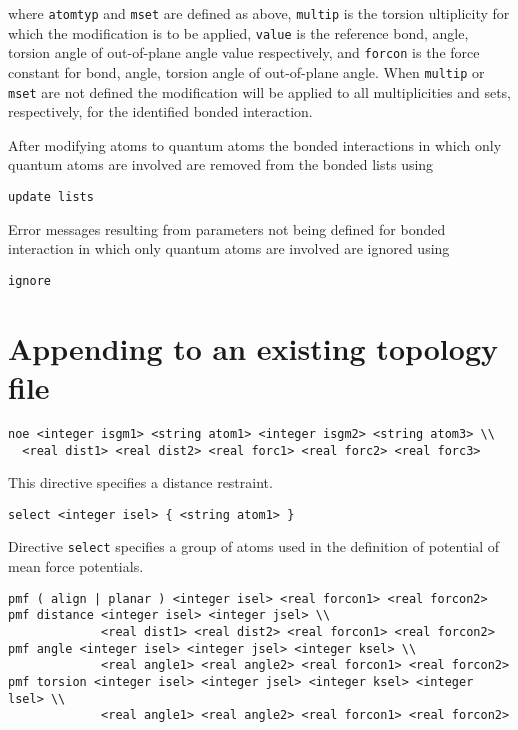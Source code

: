 where \verb+atomtyp+ and \verb+mset+ are defined as above, \verb+multip+
is the torsion ultiplicity for which the modification is to be applied,
\verb+value+ is the reference bond, angle, torsion angle of out-of-plane
angle value respectively, and \verb+forcon+ is the force constant for
bond, angle, torsion angle of out-of-plane angle. When \verb+multip+
or \verb+mset+ are not defined the modification will be applied to
all multiplicities and sets, respectively, for the identified bonded
interaction.

After modifying atoms to quantum atoms the bonded interactions in which
only quantum atoms are involved are removed from the bonded lists using

\begin{verbatim}
update lists
\end{verbatim}

Error messages resulting from parameters not being defined for bonded
interaction in which only quantum atoms are involved are ignored using

\begin{verbatim}
ignore
\end{verbatim}

\section{Appending to an existing topology file}

\begin{verbatim}
noe <integer isgm1> <string atom1> <integer isgm2> <string atom3> \\
  <real dist1> <real dist2> <real forc1> <real forc2> <real forc3>
\end{verbatim}

This directive specifies a distance restraint.

\begin{verbatim}
select <integer isel> { <string atom1> }
\end{verbatim}

Directive \verb+select+ specifies a group of atoms used in the
definition of potential of mean force potentials.

\begin{verbatim}
pmf ( align | planar ) <integer isel> <real forcon1> <real forcon2>
pmf distance <integer isel> <integer jsel> \\
             <real dist1> <real dist2> <real forcon1> <real forcon2>
pmf angle <integer isel> <integer jsel> <integer ksel> \\
             <real angle1> <real angle2> <real forcon1> <real forcon2>
pmf torsion <integer isel> <integer jsel> <integer ksel> <integer lsel> \\
             <real angle1> <real angle2> <real forcon1> <real forcon2>
\end{verbatim}

